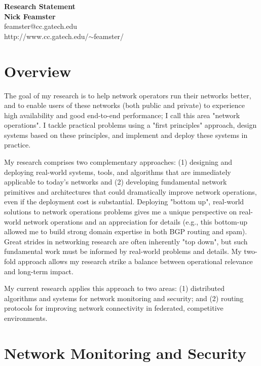 \newpage \setcounter{page}{1}

\begin{center}

{\Large\textbf{Research Statement}}\\[.1in] {\large\textbf{Nick
Feamster}}\\[.05in] feamster@cc.gatech.edu \\
http://www.cc.gatech.edu/$\sim$feamster/ \\[.1in] \end{center}


\section*{Overview}

The goal of my research is to help network operators run their networks
better, and to enable users of these networks (both public and private)
to experience high availability and good end-to-end performance; I call
this area "network operations".  I tackle practical problems using a
"first principles" approach, design systems based on these principles,
and implement and deploy these systems in practice.

My research comprises two complementary approaches: (1) designing and
deploying real-world systems, tools, and algorithms that are immediately
applicable to today's networks and (2) developing fundamental network
primitives and architectures that could dramatically improve network
operations, even if the deployment cost is substantial.  Deploying
"bottom up", real-world solutions to network operations problems gives
me a unique perspective on real-world network operations and an
appreciation for details (e.g., this bottom-up allowed me to build
strong domain expertise in both BGP routing and spam).  Great strides in
networking research are often inherently "top down", but such
fundamental work must be informed by real-world problems and details. My
two-fold approach allows my research strike a balance between
operational relevance and long-term impact.

My current research applies this approach to two areas: (1) distributed
algorithms and systems for network monitoring and security; and (2)
routing protocols for improving network connectivity in federated,
competitive environments.

\section*{Network Monitoring and Security}

